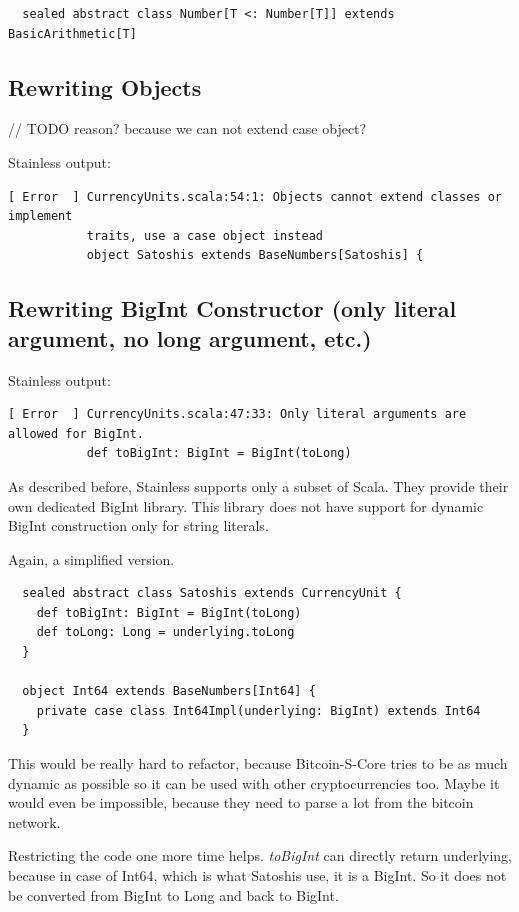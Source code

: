 \begin{lstlisting}
  sealed abstract class Number[T <: Number[T]] extends BasicArithmetic[T]  
\end{lstlisting}

\subsection{Rewriting Objects}
// TODO reason? because we can not extend case object?

Stainless output:
\begin{lstlisting}
[ Error  ] CurrencyUnits.scala:54:1: Objects cannot extend classes or implement
           traits, use a case object instead
           object Satoshis extends BaseNumbers[Satoshis] {
\end{lstlisting}

\subsection{Rewriting BigInt Constructor (only literal argument, no long argument, etc.)}
Stainless output:
\begin{lstlisting}
[ Error  ] CurrencyUnits.scala:47:33: Only literal arguments are allowed for BigInt.
           def toBigInt: BigInt = BigInt(toLong)
\end{lstlisting}
As described before, Stainless supports only a subset of Scala.
They provide their own dedicated BigInt library.
This library does not have support for dynamic BigInt construction only for string literals.

Again, a simplified version.
\begin{lstlisting}
  sealed abstract class Satoshis extends CurrencyUnit {
    def toBigInt: BigInt = BigInt(toLong)
    def toLong: Long = underlying.toLong
  }

  object Int64 extends BaseNumbers[Int64] {
    private case class Int64Impl(underlying: BigInt) extends Int64
  }
\end{lstlisting}
This would be really hard to refactor, because Bitcoin-S-Core tries to be as much dynamic as possible so it can be used with other cryptocurrencies too.
Maybe it would even be impossible, because they need to parse a lot from the bitcoin network.

Restricting the code one more time helps.
\emph{toBigInt} can directly return underlying, because in case of Int64, which is what Satoshis use, it is a BigInt.
So it does not be converted from BigInt to Long and back to BigInt.

